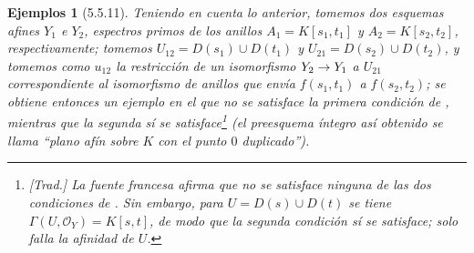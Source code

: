 \documentclass[oneside]{amsart}
\theoremstyle{ega-env-style}
\theoremstyle{ega-thm-env-style}
\theoremstyle{ega-defn-env-style}
\newtheorem*{examples}{Ejemplos}
\def\mathcal{\mathscr}
\def\sh{\mathcal}                   %
\renewcommand{\to}{\mathchoice{\longrightarrow}{\rightarrow}{\rightarrow}{\rightarrow}}
\begin{document}
\begin{examples}[5.5.11]
Teniendo en cuenta lo anterior, tomemos dos esquemas afines $Y_1$ e $Y_2$, espectros primos de los anillos $A_1=K[s_1,t_1]$ y $A_2=K[s_2,t_2]$, respectivamente;
tomemos $U_{12}=D(s_1)\cup D(t_1)$ y $U_{21}=D(s_2)\cup D(t_2)$, y tomemos como $u_{12}$ la restricción de un isomorfismo $Y_2\to Y_1$ a $U_{21}$ correspondiente al isomorfismo de anillos que envía $f(s_1,t_1)$ a $f(s_2,t_2)$;
se obtiene entonces un ejemplo en el que no se satisface la primera condición de , mientras que la segunda sí se satisface\footnote{\emph{[Trad.] La fuente francesa afirma que no se satisface ninguna de las dos condiciones de . Sin embargo, para $U=D(s)\cup D(t)$ se tiene $\Gamma(U,\sh{O}_Y)=K[s,t]$, de modo que la segunda condición sí se satisface; solo falla la afinidad de $U$.}} (el preesquema íntegro así obtenido se llama ``plano afín sobre $K$ con el punto $0$ duplicado'').
\end{examples}
\end{document}
